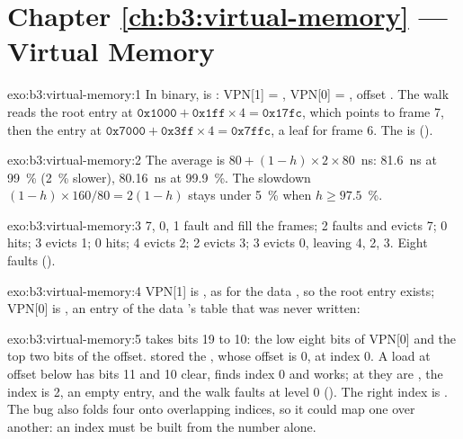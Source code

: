 \section*{Chapter \ref{ch:b3:virtual-memory} --- Virtual Memory}

\begin{solution}{exo:b3:virtual-memory:1}
In binary,  is : VPN[1] = , VPN[0] = , offset . The walk reads the root entry at $\mathtt{0x1000} + \mathtt{0x1ff} \times 4 = \mathtt{0x17fc}$, which points to frame 7, then the entry at $\mathtt{0x7000} + \mathtt{0x3ff} \times 4 = \mathtt{0x7ffc}$, a leaf for frame 6. The  is  ().
\end{solution}

\begin{solution}{exo:b3:virtual-memory:2}
The average is $80 + (1 - h) \times 2 \times 80$~ns: 81.6~ns at 99~\% (2~\% slower), 80.16~ns at 99.9~\%. The slowdown $(1 - h) \times 160 / 80 = 2(1 - h)$ stays under 5~\% when $h \ge 97.5$~\%.
\end{solution}

\begin{solution}{exo:b3:virtual-memory:3}
7, 0, 1 fault and fill the frames; 2 faults and evicts 7; 0 hits; 3 evicts 1; 0 hits; 4 evicts 2; 2 evicts 3; 3 evicts 0, leaving 4, 2, 3. Eight faults ().
\end{solution}

\begin{solution}{exo:b3:virtual-memory:4}
VPN[1] is , as for the data , so the root entry exists; VPN[0] is , an entry of the data 's table that was never written:
\label{out:b3:virtual-memory:ex4}
\end{solution}

\begin{solution}{exo:b3:virtual-memory:5}
 takes bits 19 to 10: the low eight bits of VPN[0] and the top two bits of the offset.  stored the  , whose offset is 0, at index 0. A load at offset below  has bits 11 and 10 clear, finds index 0 and works; at  they are , the index is 2, an empty entry, and the walk faults at level 0 (). The right index is . The bug also folds four  onto overlapping indices, so it could map one  over another: an index must be built from the  number alone.
\end{solution}

